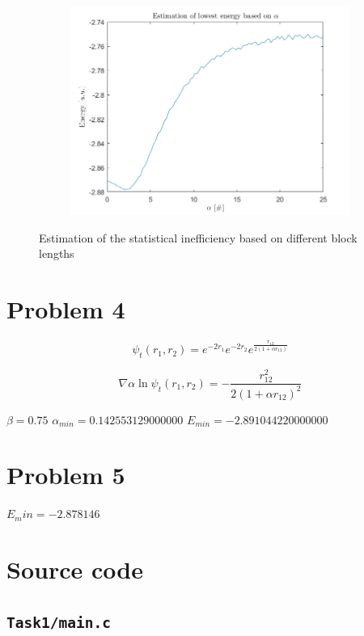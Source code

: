 \begin{figure}[H]
	\centering
	\captionsetup[subfigure]{justification=centering}
	\begin{subfigure}[b]{0.4\textwidth}
		\centering
		\includegraphics[width=\textwidth]{graphics/task3/lowest_energy.png}
	\end{subfigure}
	\caption{Estimation of the statistical inefficiency based on different block lengths}
	\label{fig:optimize_alpha}
\end{figure}



\section*{Problem 4}

\begin{equation}
	\psi_t(r_1,r_2) = e^{-2r_1}e^{-2r_2}e^{\frac{r_{12}}{2(1+\alpha r_{12})}}
\end{equation}

\begin{equation}
	\nabla \alpha \ln{\psi_t(r_1,r_2)} = -\frac{r_{12}^2}{2(1+\alpha r_{12})^2}
\end{equation}

$\beta = 0.75$
$\alpha_{min}=0.142553129000000$
$E_{min}=-2.891044220000000$

\section*{Problem 5}

$E_min=-2.878146$


\appendix
\section{Source code}

\subsection{\texttt{Task1/main.c}}
%


